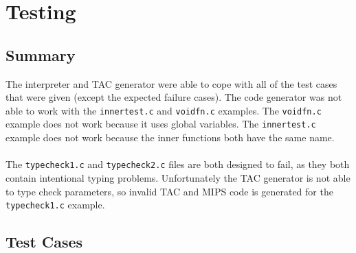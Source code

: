 \chapter{Testing}

\section{Summary}
The interpreter and TAC generator were able to cope with all of the test cases that were given (except the expected failure cases). The code generator was not able to work with the \verb!innertest.c! and \verb!voidfn.c! examples. The \verb!voidfn.c! example does not work because it uses global variables. The \verb!innertest.c! example does not work because the inner functions both have the same name.
\ \\ \ \\
The \verb!typecheck1.c! and \verb!typecheck2.c! files are both designed to fail, as they both contain intentional typing problems. Unfortunately the TAC generator is not able to type check parameters, so invalid TAC and MIPS code is generated for the \verb!typecheck1.c! example.

\section{Test Cases}
\newpage
\newpage
\newpage
\newpage
\newpage
\newpage
\newpage
\newpage
\newpage
\newpage
\newpage
\newpage
\newpage
\newpage
\newpage
\newpage
\newpage
\newpage
\newpage
\newpage
\newpage
\newpage
\newpage
\newpage
